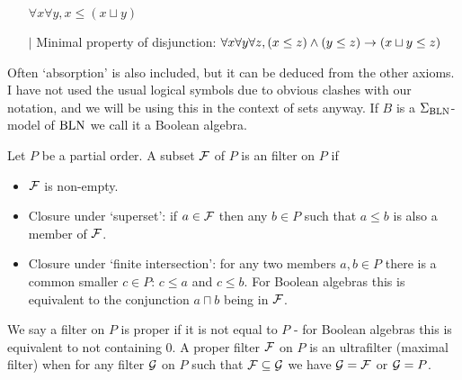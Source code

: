 \begin{dfn}
\begin{itemize}
            $\forall x \forall y, x \leq (x \sqcup y)$ 
        \item[$\vert$] Minimal property of disjunction:
            $\forall x \forall y \forall z, 
            (x \leq z) \land (y \leq z) \to (x \sqcup y \leq z)$ 
        \end{itemize}
    Often `absorption' is also included, 
    but it can be deduced from the other axioms.
    I have not used the usual logical symbols due to obvious clashes with 
    our notation, 
    and we will be using this in the context of sets anyway.
    If $B$ is a $\Sigma_{\mathrm{BLN}}$-model of $\mathrm{BLN}$ we call it a Boolean algebra.
\end{dfn}

\begin{dfn}
    Let $P$ be a partial order.
    A subset $\mathcal{F}$ of $P$ is an filter on $P$ if
    \begin{itemize}
        \item $\mathcal{F}$ is non-empty.
        \item Closure under `superset': if $a \in \mathcal{F}$ then any $b \in P$ 
            such that $a \leq b$ is also a member of $\mathcal{F}$. %
        \item Closure under `finite intersection':
            for any two members $a,b \in P$ there is a common smaller 
            $c \in P$: $c \leq a$ and $c \leq b$. For 
            Boolean algebras this is equivalent to the conjunction
            $a \sqcap b$ being in $\mathcal{F}$.
    \end{itemize}
    We say a filter on $P$ is proper if it is not equal to $P$
    - for Boolean algebras this is equivalent to not containing $0$.
    A proper filter $\mathcal{F}$ on $P$ is an ultrafilter (maximal filter) when
    for any filter $\mathcal{G}$ on $P$ such that $\mathcal{F} \subseteq \mathcal{G}$ we have $\mathcal{G} = \mathcal{F}$ 
    or $\mathcal{G} = P$.
\end{dfn}

